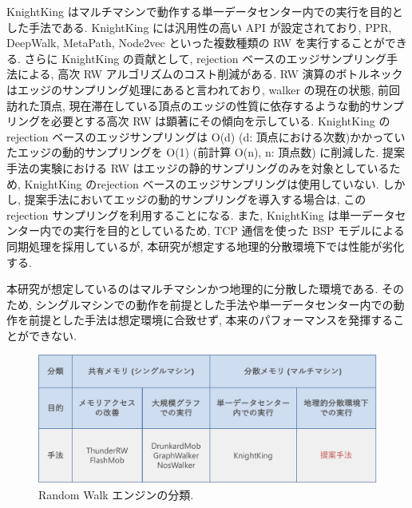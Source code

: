 KnightKing\cite{10.1145/3341301.3359634} はマルチマシンで動作する単一データセンター内での実行を目的とした手法である. KnightKing には汎用性の高い API が設定されており, PPR, DeepWalk, MetaPath, Node2vec といった複数種類の RW を実行することができる. さらに KnightKing の貢献として, rejection ベースのエッジサンプリング手法による, 高次 RW アルゴリズムのコスト削減がある. RW 演算のボトルネックはエッジのサンプリング処理にあると言われており, walker の現在の状態, 前回訪れた頂点, 現在滞在している頂点のエッジの性質に依存するような動的サンプリングを必要とする高次 RW は顕著にその傾向を示している. KnightKing の rejection ベースのエッジサンプリングは O(d) (d: 頂点における次数)かかっていたエッジの動的サンプリングを O(1) (前計算 O(n), n: 頂点数) に削減した. 提案手法の実験における RW はエッジの静的サンプリングのみを対象としているため, KnightKing のrejection ベースのエッジサンプリングは使用していない. しかし, 提案手法においてエッジの動的サンプリングを導入する場合は, この rejection サンプリングを利用することになる. また, KnightKing は単一データセンター内での実行を目的としているため, TCP 通信を使った BSP モデルによる同期処理を採用しているが, 本研究が想定する地理的分散環境下では性能が劣化する. 

本研究が想定しているのはマルチマシンかつ地理的に分散した環境である. そのため, シングルマシンでの動作を前提とした手法や単一データセンター内での動作を前提とした手法は想定環境に合致せず, 本来のパフォーマンスを発揮することができない. 

\begin{figure}[t]
    \centering
    \includegraphics[scale=0.5]{figure/RWEngine.pdf}
    \caption{Random Walk エンジンの分類.}
    \label{Random Walk エンジンの分類}
\end{figure}

